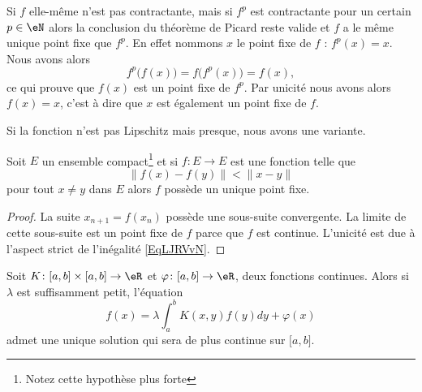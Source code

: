 \begin{remark}  \label{remIOHUJm}
    Si \( f\) elle-même n'est pas contractante, mais si \( f^p\) est contractante pour un certain \( p\in \eN\) alors la conclusion du théorème de Picard reste valide et \( f\) a le même unique point fixe que \( f^p\). En effet nommons \( x\) le point fixe de \( f\) : \( f^p(x)=x\). Nous avons alors
    \begin{equation}
        f^p\big( f(x) \big)=f\big( f^p(x) \big)=f(x),
    \end{equation}
    ce qui prouve que \( f(x)\) est un point fixe de \( f^p\). Par unicité nous avons alors \( f(x)=x\), c'est à dire que \( x\) est également un point fixe de \( f\).
\end{remark}

Si la fonction n'est pas Lipschitz mais presque, nous avons une variante.
\begin{proposition}
    Soit \( E\) un ensemble compact\footnote{Notez cette hypothèse plus forte} et si \( f\colon E\to E\) est une fonction telle que
    \begin{equation}        \label{EqLJRVvN}
        \| f(x)-f(y) \|< \| x-y \|
    \end{equation}
    pour tout \( x\neq y\) dans \( E\) alors \( f\) possède un unique point fixe.
\end{proposition}

\begin{proof}
    La suite \( x_{n+1}=f(x_n)\) possède une sous-suite convergente. La limite de cette sous-suite est un point fixe de \( f\) parce que \( f\) est continue. L'unicité est due à l'aspect strict de l'inégalité \eqref{EqLJRVvN}.
\end{proof}

\begin{theorem}     \label{ThoagJPZJ}
    Soit \( K\colon \mathopen[ a , b \mathclose]\times \mathopen[ a , b \mathclose]\to \eR\) et \( \varphi\colon \mathopen[ a , b \mathclose]\to \eR\), deux fonctions continues. Alors si \( \lambda\) est suffisamment petit, l'équation
    \begin{equation}
        f(x)=\lambda\int_a^bK(x,y)f(y)dy+\varphi(x)
    \end{equation}
    admet une unique solution qui sera de plus continue sur \( \mathopen[ a , b \mathclose]\).
\end{theorem}

